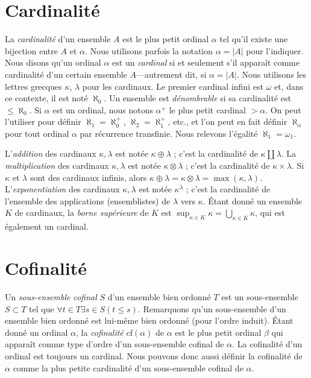 \section{Cardinalité}
\label{section-cardinals}

\noindent
La {\it cardinalité} d'un ensemble $A$ est le plus petit ordinal $\alpha$ tel
qu'il existe une bijection entre $A$ et $\alpha$. Nous utilisons parfois la
notation $\alpha = |A|$ pour l'indiquer. Nous disons qu'un ordinal $\alpha$ est
un {\it cardinal} si et seulement s'il apparaît comme cardinalité d'un certain
ensemble $A$---autrement dit, si $\alpha = |A|$. Nous utilisons les lettres
grecques $\kappa$, $\lambda$ pour les cardinaux. Le premier cardinal infini est
$\omega$ et, dans ce contexte, il est noté $\aleph_0$. Un ensemble est
{\it dénombrable} si sa cardinalité est $\leq \aleph_0$. Si $\alpha$ est un
ordinal, nous notons $\alpha^+$ le plus petit cardinal $> \alpha$. On peut
l'utiliser pour définir $\aleph_1 = \aleph_0^+$,
$\aleph_2 = \aleph_1^+$, etc., et l'on peut en fait définir $\aleph_\alpha$
pour tout ordinal $\alpha$ par récurrence transfinie. Nous relevons l'égalité
$\aleph_1 = \omega_1$.

\medskip\noindent
L'{\it addition} des cardinaux $\kappa, \lambda$ est notée
$\kappa \oplus \lambda$ ; c'est la cardinalité de
$\kappa \amalg \lambda$. La {\it multiplication} des cardinaux
$\kappa, \lambda$ est notée $\kappa \otimes \lambda$ ; c'est la cardinalité
de $\kappa \times \lambda$. Si $\kappa$ et $\lambda$ sont des cardinaux
infinis, alors
$\kappa \oplus \lambda = \kappa \otimes \lambda = \max(\kappa, \lambda)$.
L'{\it exponentiation} des cardinaux $\kappa, \lambda$ est notée
$\kappa^\lambda$ ; c'est la cardinalité de l'ensemble des applications
(ensemblistes) de $\lambda$ vers $\kappa$. Étant donné un ensemble $K$ de
cardinaux, la {\it borne supérieure} de $K$ est
$\sup_{\kappa \in K} \kappa = \bigcup_{\kappa \in K} \kappa$, qui est
également un cardinal.

\section{Cofinalité}
\label{section-cofinality}

\noindent
Un {\it sous-ensemble cofinal} $S$ d'un ensemble bien ordonné $T$ est un
sous-ensemble $S \subset T$ tel que
$\forall t \in T \exists s\in S (t \leq s)$. Remarquons qu'un sous-ensemble
d'un ensemble bien ordonné est lui-même bien ordonné (pour l'ordre induit).
Étant donné un ordinal $\alpha$, la {\it cofinalité} $\text{cf}(\alpha)$ de
$\alpha$ est le plus petit ordinal $\beta$ qui apparaît comme type d'ordre
d'un sous-ensemble cofinal de $\alpha$. La cofinalité d'un ordinal est toujours
un cardinal. Nous pouvons donc aussi définir la cofinalité de $\alpha$ comme la
plus petite cardinalité d'un sous-ensemble cofinal de $\alpha$.

